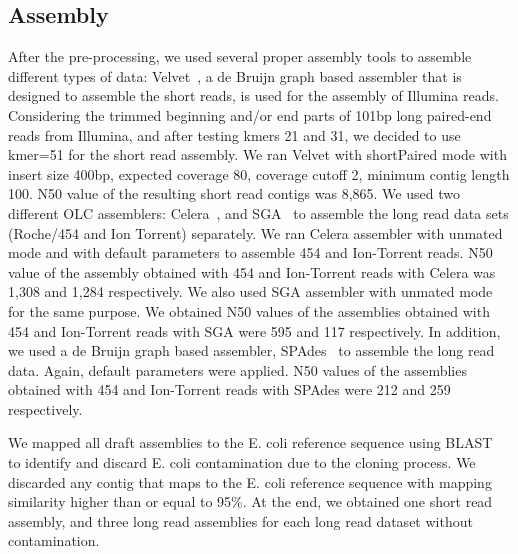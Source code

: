 \documentclass{llncs}
\begin{document}
\subsection{Assembly} 
After the pre-processing, we used several proper assembly tools to assemble different types of data: Velvet~\cite{velvetZerbino:2008}, a de Bruijn graph based assembler that is designed to assemble the short reads, is used for the assembly of Illumina reads. Considering the trimmed beginning and/or end parts of 101bp long paired-end reads from Illumina, and after testing kmers 21 and 31, we decided to use kmer=51 for the short read assembly. We ran Velvet with shortPaired mode with insert size 400bp, expected coverage 80, coverage cutoff 2, minimum contig length 100. N50 value of the resulting short read contigs was 8,865. We used two different OLC assemblers: Celera~\cite{celera:2000}, and SGA~\cite{sga:2012} to assemble the long read data sets (Roche/454 and Ion Torrent) separately. We ran Celera assembler with unmated mode and with default parameters to assemble 454 and Ion-Torrent reads. N50 value of the assembly obtained with 454 and Ion-Torrent reads with Celera was 1,308 and 1,284 respectively. We also used SGA assembler with unmated mode for the same purpose. We obtained N50 values of the assemblies obtained with 454 and Ion-Torrent reads with SGA were 595 and 117 respectively. In addition, we used a de Bruijn graph based assembler, SPAdes~\cite{spadesBankevich:2012} to assemble the long read data. Again, default parameters were applied. N50 values of the assemblies obtained with 454 and Ion-Torrent reads with SPAdes were 212 and 259 respectively.

We mapped all draft assemblies to the E. coli reference sequence using BLAST~\cite{blast} to identify and discard E. coli contamination due to the cloning process. We discarded any contig that maps to the E. coli reference sequence with mapping similarity higher than or equal to 95\%. At the end, we obtained one short read assembly, and three long read assemblies for each long read dataset without contamination.
\end{document}
